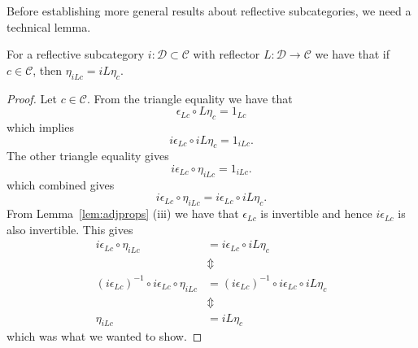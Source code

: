 Before establishing more general results about reflective subcategories, we need a technical lemma.
\begin{lemma}
  \label{lem:com}
  For a reflective subcategory $ i:\mathcal{D} \subset \mathcal{C} $ with reflector $ L: \mathcal{D} \to \mathcal{C} $ we have that if $ c \in \mathcal{C} $, then $ \eta_{iLc} = iL\eta_c $.
\end{lemma}
\begin{proof}
  Let $ c \in \mathcal{C} $. From the triangle equality we have that
  \begin{equation}
    \epsilon_{Lc} \circ L\eta_c = 1_{Lc}
  \end{equation}
  which implies
  \begin{equation}
    i\epsilon_{Lc} \circ iL\eta_c = 1_{iLc}.
  \end{equation}
  The other triangle equality gives
  \begin{equation}
    i\epsilon_{Lc} \circ \eta_{iLc} = 1_{iLc}.
  \end{equation}
  which combined gives
  \begin{equation}
    i\epsilon_{Lc} \circ \eta_{iLc} = i\epsilon_{Lc} \circ iL\eta_{c}.
  \end{equation}
  From Lemma~\ref{lem:adjprops} (iii) we have that $ \epsilon_{Lc} $ is invertible and hence $ i\epsilon_{Lc} $ is also invertible. This gives
  \begin{align*}
    i\epsilon_{Lc} \circ \eta_{iLc} &= i\epsilon_{Lc} \circ iL\eta_{c} \\
                                    &\Updownarrow \\
    (i\epsilon_{Lc})^{-1} \circ i\epsilon_{Lc} \circ \eta_{iLc} &= (i\epsilon_{Lc})^{-1} \circ i\epsilon_{Lc} \circ iL\eta_{c} \\
                                                                &\Updownarrow \\
    \eta_{iLc} &= iL\eta_c
  \end{align*}
  which was what we wanted to show.
\end{proof}


